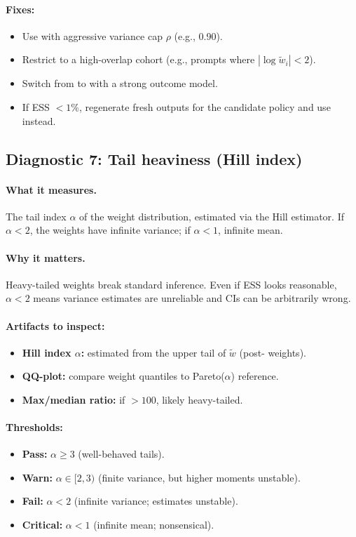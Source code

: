 \paragraph{Fixes:}
\begin{itemize}
\item Use \simcal{} with aggressive variance cap $\rho$ (e.g., 0.90).
\item Restrict to a high-overlap cohort (e.g., prompts where $|\log \tilde{w}_i| < 2$).
\item Switch from \ips{} to \dr{} with a strong outcome model.
\item If ESS $< 1\%$, regenerate fresh outputs for the candidate policy and use \dm{} instead.
\end{itemize}

\subsection{Diagnostic 7: Tail heaviness (Hill index)}

\paragraph{What it measures.} The tail index $\alpha$ of the weight distribution, estimated via the Hill estimator. If $\alpha < 2$, the weights have infinite variance; if $\alpha < 1$, infinite mean.

\paragraph{Why it matters.} Heavy-tailed weights break standard inference. Even if ESS looks reasonable, $\alpha < 2$ means variance estimates are unreliable and CIs can be arbitrarily wrong.

\paragraph{Artifacts to inspect:}
\begin{itemize}
\item \textbf{Hill index $\alpha$:} estimated from the upper tail of $\tilde{w}$ (post-\simcal{} weights).
\item \textbf{QQ-plot:} compare weight quantiles to Pareto($\alpha$) reference.
\item \textbf{Max/median ratio:} if $> 100$, likely heavy-tailed.
\end{itemize}

\paragraph{Thresholds:}
\begin{itemize}
\item \textbf{Pass:} $\alpha \ge 3$ (well-behaved tails).
\item \textbf{Warn:} $\alpha \in [2, 3)$ (finite variance, but higher moments unstable).
\item \textbf{Fail:} $\alpha < 2$ (infinite variance; estimates unstable).
\item \textbf{Critical:} $\alpha < 1$ (infinite mean; nonsensical).
\end{itemize}

